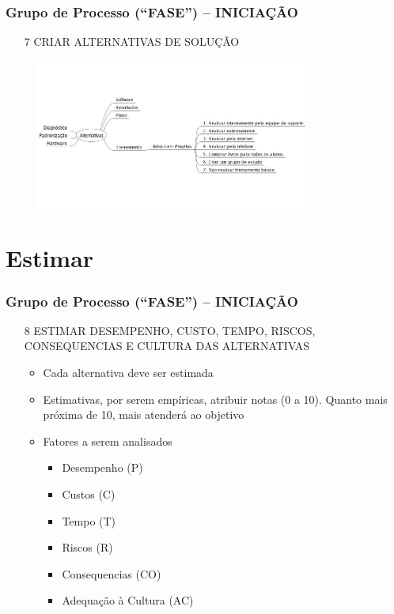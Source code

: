 \begin{frame}
   \frametitle{Grupo de Processo (“FASE”) – INICIAÇÃO}
   \begin{itemize}
    \item[7] CRIAR ALTERNATIVAS DE SOLUÇÃO
   \end{itemize}
   \begin{figure}
    \centering
    \includegraphics[width = 0.8\textwidth]{figs/fig1_13.png}
   \end{figure}
\end{frame}
\section{Estimar}
\begin{frame}
 \frametitle{Grupo de Processo (“FASE”) – INICIAÇÃO}
 \begin{itemize}
  \item[8] ESTIMAR DESEMPENHO, CUSTO, TEMPO, RISCOS, CONSEQUENCIAS E CULTURA DAS ALTERNATIVAS
  \begin{itemize}
   \item Cada alternativa deve ser estimada
   \item Estimativas, por serem empíricas, atribuir notas (0 a 10). Quanto mais próxima de 10, mais atenderá ao objetivo
   \item Fatores a serem analisados
   \begin{itemize}
    \item Desempenho (P)
    \item Custos (C)
    \item Tempo (T)
    \item Riscos (R)
    \item Consequencias (CO)
    \item Adequação à Cultura (AC)
   \end{itemize}

  \end{itemize}

 \end{itemize}

\end{frame}


